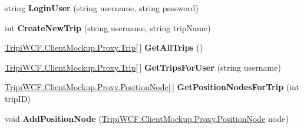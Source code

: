 \begin{DoxyCompactItemize}
\item 
\hypertarget{interface_tripi_w_c_f_1_1_client_mockup_1_1_proxy_1_1_i_trip_service_a446a7cca0e65b64914da8a5abb56ea9b}{
string {\bfseries LoginUser} (string username, string password)}
\label{interface_tripi_w_c_f_1_1_client_mockup_1_1_proxy_1_1_i_trip_service_a446a7cca0e65b64914da8a5abb56ea9b}

\item 
\hypertarget{interface_tripi_w_c_f_1_1_client_mockup_1_1_proxy_1_1_i_trip_service_a5f64f3357b29ee25e2ff400bd1953efb}{
int {\bfseries CreateNewTrip} (string username, string tripName)}
\label{interface_tripi_w_c_f_1_1_client_mockup_1_1_proxy_1_1_i_trip_service_a5f64f3357b29ee25e2ff400bd1953efb}

\item 
\hypertarget{interface_tripi_w_c_f_1_1_client_mockup_1_1_proxy_1_1_i_trip_service_abc1b1dc6819d30392eaf1652393fba56}{
\hyperlink{class_tripi_w_c_f_1_1_client_mockup_1_1_proxy_1_1_trip}{TripiWCF.ClientMockup.Proxy.Trip}\mbox{[}$\,$\mbox{]} {\bfseries GetAllTrips} ()}
\label{interface_tripi_w_c_f_1_1_client_mockup_1_1_proxy_1_1_i_trip_service_abc1b1dc6819d30392eaf1652393fba56}

\item 
\hypertarget{interface_tripi_w_c_f_1_1_client_mockup_1_1_proxy_1_1_i_trip_service_a73334ca5ba2410491360b8c8f32d720f}{
\hyperlink{class_tripi_w_c_f_1_1_client_mockup_1_1_proxy_1_1_trip}{TripiWCF.ClientMockup.Proxy.Trip}\mbox{[}$\,$\mbox{]} {\bfseries GetTripsForUser} (string username)}
\label{interface_tripi_w_c_f_1_1_client_mockup_1_1_proxy_1_1_i_trip_service_a73334ca5ba2410491360b8c8f32d720f}

\item 
\hypertarget{interface_tripi_w_c_f_1_1_client_mockup_1_1_proxy_1_1_i_trip_service_a94f0b89ebce82a430cac8e5867fe8406}{
\hyperlink{class_tripi_w_c_f_1_1_client_mockup_1_1_proxy_1_1_position_node}{TripiWCF.ClientMockup.Proxy.PositionNode}\mbox{[}$\,$\mbox{]} {\bfseries GetPositionNodesForTrip} (int tripID)}
\label{interface_tripi_w_c_f_1_1_client_mockup_1_1_proxy_1_1_i_trip_service_a94f0b89ebce82a430cac8e5867fe8406}

\item 
\hypertarget{interface_tripi_w_c_f_1_1_client_mockup_1_1_proxy_1_1_i_trip_service_a27741eac5f6c01d6f17f053b27bd2224}{
void {\bfseries AddPositionNode} (\hyperlink{class_tripi_w_c_f_1_1_client_mockup_1_1_proxy_1_1_position_node}{TripiWCF.ClientMockup.Proxy.PositionNode} node)}
\label{interface_tripi_w_c_f_1_1_client_mockup_1_1_proxy_1_1_i_trip_service_a27741eac5f6c01d6f17f053b27bd2224}


\end{DoxyCompactItemize}
